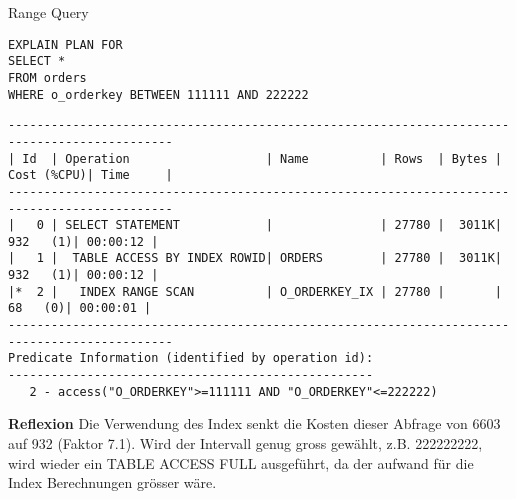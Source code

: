 \documentclass[10pt]{article}
\begin{document}
Range Query
\begin{lstlisting}[style=sql]
EXPLAIN PLAN FOR
SELECT *
FROM orders
WHERE o_orderkey BETWEEN 111111 AND 222222
\end{lstlisting}
\begin{lstlisting}[style=queryexecutionplan]
---------------------------------------------------------------------------------------------
| Id  | Operation                   | Name          | Rows  | Bytes | Cost (%CPU)| Time     |
---------------------------------------------------------------------------------------------
|   0 | SELECT STATEMENT            |               | 27780 |  3011K|   932   (1)| 00:00:12 |
|   1 |  TABLE ACCESS BY INDEX ROWID| ORDERS        | 27780 |  3011K|   932   (1)| 00:00:12 |
|*  2 |   INDEX RANGE SCAN          | O_ORDERKEY_IX | 27780 |       |    68   (0)| 00:00:01 |
---------------------------------------------------------------------------------------------
Predicate Information (identified by operation id):
---------------------------------------------------
   2 - access("O_ORDERKEY">=111111 AND "O_ORDERKEY"<=222222)
\end{lstlisting}
\textbf{Reflexion} \newline
Die Verwendung des Index senkt die Kosten dieser Abfrage von 6603 auf 932 (Faktor 7.1). Wird der Intervall genug gross gewählt, z.B. 222222222, wird wieder ein TABLE ACCESS FULL ausgeführt, da der aufwand für die Index Berechnungen grösser wäre.
\end{document}
